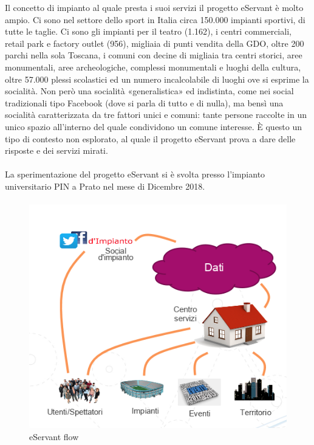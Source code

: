 Il concetto di impianto al quale presta i suoi servizi il progetto eServant è molto ampio.
Ci sono nel settore dello sport in Italia circa 150.000 impianti sportivi, di tutte le taglie. Ci sono gli impianti per il teatro (1.162), i centri commerciali, retail park e factory outlet (956), migliaia di punti vendita della GDO, oltre 200 parchi nella sola Toscana, i comuni con decine di migliaia tra centri storici, aree monumentali, aree archeologiche, complessi monumentali e luoghi della cultura, oltre 57.000 plessi scolastici ed un numero incalcolabile di luoghi ove si esprime la socialità.
Non però una socialità «generalistica» ed indistinta, come nei social tradizionali tipo Facebook (dove si parla di tutto e di nulla), ma bensì una socialità caratterizzata da tre fattori unici e comuni:
tante persone
raccolte in un unico spazio
all’interno del quale condividono un comune interesse.
È questo un tipo di contesto non esplorato, al quale il progetto eServant prova a dare delle risposte e dei servizi mirati.
\paragraph{}

La sperimentazione del progetto eServant si è svolta presso l’impianto universitario PIN a Prato nel mese di Dicembre 2018.
\paragraph{}

\begin{figure}[h!]
    \centering  
    \caption{eServant flow}
    \includegraphics[scale=0.8]{img/cap1/eservant}
\end{figure}

